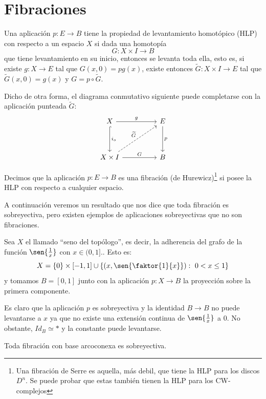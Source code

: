 \section{Fibraciones}
\begin{defin}
Una aplicación $p : E \longrightarrow B$ tiene la propiedad de levantamiento homotópico (HLP) con respecto a un espacio $X$ si dada una homotopía 
\[
G : X \times I \longrightarrow B
\]
que tiene levantamiento en su inicio, entonces se levanta toda ella, esto es, si existe $g : X \longrightarrow E$ tal que  $G(x, 0) = pg(x)$, existe entonces $\widetilde{G} : X \times I \longrightarrow E$ tal que $\widetilde{G}(x,0) = g(x)$ y $G = p \circ \widetilde{G}$. \par
Dicho de otra forma, el diagrama conmutativo siguiente puede completarse con la aplicación punteada $\widetilde{G}$:
\[
\begin{tikzcd}
X \arrow{rr}{g} \arrow[hook]{dd}{i_o} &  & E \arrow{dd}{p} \\
\\
X \times I \arrow{rr}{G} \arrow[dashed]{uurr}{\widetilde{G}} & & B
\end{tikzcd}
\]
\end{defin}
\begin{defin}
Decimos que la aplicación $p : E \longrightarrow B$ es una fibración (de Hurewicz)\footnote{Una fibración de Serre es aquella, más debil, que tiene la HLP para los discos $D^n$. Se puede probar que estas también tienen la HLP para los CW-complejos} si posee la HLP con respecto a cualquier espacio.
\end{defin}
A continuación veremos un resultado que nos dice que toda fibración es sobreyectiva, pero existen ejemplos de aplicaciones sobreyectivas que no son fibraciones.
\begin{ejem}
Sea $X$ el llamado ``seno del topólogo'', es decir, la adherencia del grafo de la función $\sen{\frac{1}{x}}$ con $x \in (0,1]$.. Esto es:
\[ X = \{0\} \times [-1,1] \cup \{ (x, \sen{\faktor{1}{x}}) : \ 0 < x \leq 1 \} \]
y tomamos $B = [0,1]$ junto con la aplicación $p : X \longrightarrow B$ la proyección sobre la primera componente. \par
Es claro que la aplicación $p$ es sobreyectiva y la identidad $B \longrightarrow B$ no puede levantarse a $x$ ya que no existe una extensión continua de $\sen{\frac{1}{x}}$ a $0$. No obstante, $Id_B \simeq *$ y la constante puede levantarse.
\end{ejem}
\begin{prop}
Toda fibración con base arcoconexa es sobreyectiva.
\end{prop}
